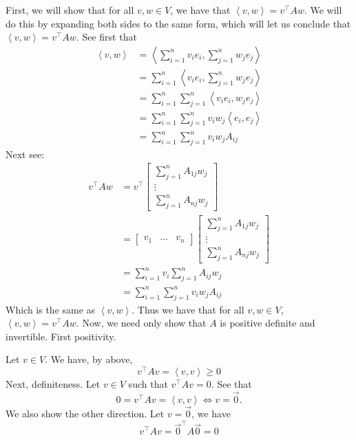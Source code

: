 \documentclass[answers]{exam}
\newcommand{\ip}[1]{\left\langle#1\right\rangle}
\begin{document}
\begin{questions}
\begin{parts}
\begin{solution}
            First, we will show that for all $v,w\in V$, we have that $\ip{v,w} = v^\top Aw$. We will do this 
            by expanding both sides to the same form, which will let us conclude that $\ip{v,w}=v^\top Aw$.
            See first that 
            \begin{align*}
                \ip{v,w} &= \ip{\sum_{i=1}^n v_ie_i,\sum_{j=1}^n w_je_j} \\
                &= \sum_{i=1}^n\ip{v_ie_i,\sum_{j=1}^n w_je_j} \\
                &= \sum_{i=1}^n\sum_{j=1}^n\ip{v_ie_i,w_je_j} \\
                &= \sum_{i=1}^n\sum_{j=1}^nv_iw_j\ip{e_i,e_j} \\
                &= \sum_{i=1}^n\sum_{j=1}^nv_iw_jA_{ij}
            \end{align*}
            Next see:
            \begin{align*}
                v^\top Aw &= v^\top \begin{bmatrix}
                    \sum_{j=1}^nA_{1j}w_j \\
                    \vdots \\
                    \sum_{j=1}^nA_{nj}w_j 
                \end{bmatrix} \\
                &= \begin{bmatrix} v_1 & \dots & v_n \end{bmatrix}\begin{bmatrix}
                    \sum_{j=1}^nA_{1j}w_j \\
                    \vdots \\
                    \sum_{j=1}^nA_{nj}w_j 
                \end{bmatrix} \\
                &= \sum_{i=1}^n v_i\sum_{j=1}^n A_{ij}w_j \\
                &= \sum_{i=1}^n \sum_{j=1}^n v_iw_j A_{ij}
            \end{align*}
            Which is the same as $\ip{v,w}$. Thus we have that for all $v,w\in V$, $\ip{v,w} = v^\top Aw$. Now,
            we need only show that $A$ is positive definite and invertible. First positivity.

            Let $v\in V$. We have, by above, 
            \[
                v^\top Av = \ip{v,v} \geq 0
            \]
            Next, definiteness. Let $v\in V$ such that $v^\top Av = 0$. See that
            \[
                0 = v^\top Av = \ip{v,v} \iff v = \vec{0}.
            \]
            We also show the other direction. Let $v=\vec{0}$, we have
            \[
                v^\top Av = \vec{0}^\top A\vec{0} = 0
            \]


\end{solution}
\end{parts}
\end{questions}
\end{document}
